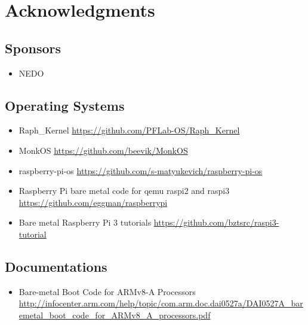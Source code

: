 \section{Acknowledgments}

\subsection{Sponsors}

\begin{itemize}
\item NEDO
\end{itemize}

\subsection{Operating Systems}

\begin{itemize}
\item Raph\_Kernel
  \url{https://github.com/PFLab-OS/Raph_Kernel}
\item MonkOS
  \url{https://github.com/beevik/MonkOS}
\item raspberry-pi-os
  \url{https://github.com/s-matyukevich/raspberry-pi-os}
\item Raspberry Pi bare metal code for qemu raspi2 and raspi3
  \url{https://github.com/eggman/raspberrypi}
\item Bare metal Raspberry Pi 3 tutorials
  \url{https://github.com/bztsrc/raspi3-tutorial}
\end{itemize}

\subsection{Documentations}

\begin{itemize}
\item Bare-metal Boot Code for ARMv8-A Processors
  \url{http://infocenter.arm.com/help/topic/com.arm.doc.dai0527a/DAI0527A_baremetal_boot_code_for_ARMv8_A_processors.pdf}
\end{itemize}

